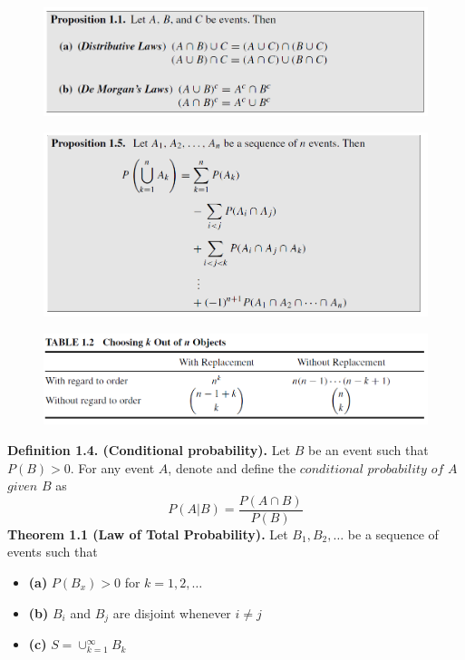 \documentclass[12pt,a4paper]{report}
\begin{document}
\begin{figure}[H]
\centering
\includegraphics[width=\textwidth]{figures/demorgan.png}
\end{figure}
\begin{figure}
\centering
\includegraphics[width=\textwidth]{figures/inc-exc.png}
\end{figure}
\begin{figure}
\centering
\includegraphics[width=\textwidth]{figures/choosing_skema.png}
\end{figure}
\textbf{Definition 1.4. (Conditional probability).} Let $B$ be an event such that $P(B)>0$. For any event $A$, denote and define the $conditional$ $probability$ $of$ $A$ $given$ $B$ as
\begin{equation}
P(A|B)=\frac{P(A\cap B)}{P(B)}
\end{equation}
\textbf{Theorem 1.1 (Law of Total Probability).} Let $B_1,B_2,\ldots$ be a sequence of events such that
\begin{itemize}
\item[] \textbf{(a)} $P(B_x)>0$ for $k=1,2,\ldots$
\item[] \textbf{(b)} $B_i$ and $B_j$ are disjoint whenever $i\neq j$
\item[] \textbf{(c)} $S=\cup_{k=1}^{\infty}B_k$
\end{itemize}
\end{document}
